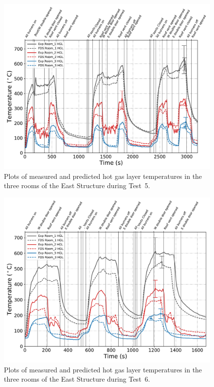 \begin{figure}[!h]
	\centering
	\includegraphics[width=\columnwidth]{Figures/Plots/Validation/Temperature/Test_5_HGL}
	\caption[Plots of measured and predicted hot gas layer temperatures during Test~5.]{Plots of measured and predicted hot gas layer temperatures in the three rooms of the East Structure during Test~5.}
	\label{fig:HGL_data_Test5}
\end{figure}

\begin{figure}[!h]
	\centering
	\includegraphics[width=\columnwidth]{Figures/Plots/Validation/Temperature/Test_6_HGL}
	\caption[Plots of measured and predicted hot gas layer temperatures during Test~6.]{Plots of measured and predicted hot gas layer temperatures in the three rooms of the East Structure during Test~6.}
	\label{fig:HGL_data_Test6}
\end{figure}

